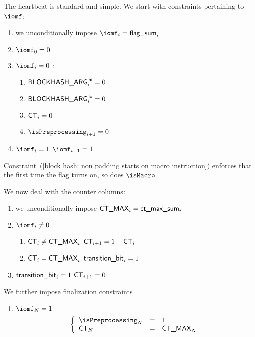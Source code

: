 The heartbeat is standard and simple. We start with constraints pertaining to $\iomf$:
\begin{enumerate}
	\item we unconditionally impose $\iomf _{i} = \locFlagSum _{i}$
	\item $\iomf_{0} = 0$
	\item \If $\iomf_{i} = 0$ \Then:
	\begin{enumerate}
		\item $\textsf{BLOCKHASH\_ARG}^{\mathsf{\,hi}} _{i} = 0$
		\item $\textsf{BLOCKHASH\_ARG}^{\mathsf{\,lo}}  _{i} = 0$
		\item $\textsf{CT} _{i} = 0$
		\item \label{block hash: non padding starts on macro instruction} $\isPreprocessing _{i + 1} = 0$
	\end{enumerate}
	\item \If $\iomf_{i} = 1$ \Then $\iomf _{i + 1} = 1$
\end{enumerate}
\saNote{}
Constraint~(\ref{block hash: non padding starts on macro instruction}) enforces that the first time
the \iomf{} flag turns on, so does $\isMacro$.

\noindent We now deal with the counter columns:
\begin{enumerate}[resume]
	\item we unconditionally impose $\textsf{CT\_MAX} _{i} = \textsf{ct\_max\_sum} _{i}$
	\item \If $\iomf _{i} \neq 0$ \Then
		\begin{enumerate}
			\item \If $\textsf{CT} _{i} \neq \textsf{CT\_MAX} _{i}$ \Then $\textsf{CT} _{i + 1} = 1 + \textsf{CT} _{i}$
			\item \If $\textsf{CT} _{i} =    \textsf{CT\_MAX} _{i}$ \Then $\textsf{transition\_bit} _{i} = 1$
		\end{enumerate}
	\item \If $\textsf{transition\_bit} _{i} = 1$ \Then $\textsf{CT} _{i + 1} = 0$
\end{enumerate}
We further impose finalization constraints
\begin{enumerate}[resume]
	\item \If $\iomf _{N} = 1$ \Then
		\[
			\left\{ \begin{array}{lcl}
				\isPreprocessing _{N} & = & 1           \\
				\ct              _{N} & = & \maxCt _{N} \\
			\end{array} \right.
		\]
\end{enumerate}
